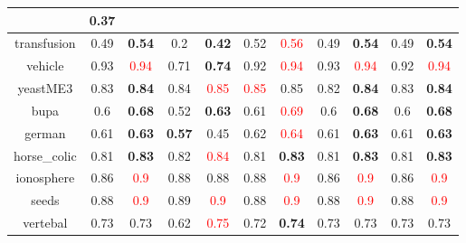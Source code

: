 \documentclass{article}%
\begin{document}
\begin{tabular}{c|cccccccccc}
{}&0.37\\%
\hline%
transfusion&0.49&\textbf{0.54}&0.2&\textbf{0.42}&0.52&\textcolor{red}{ 
0.56
}&0.49&\textbf{0.54}&0.49&\textbf{0.54}\\%
\hline%
vehicle&0.93&\textcolor{red}{ 
0.94
}&0.71&\textbf{0.74}&0.92&\textcolor{red}{ 
0.94
}&0.93&\textcolor{red}{ 
0.94
}&0.92&\textcolor{red}{ 
0.94
}\\%
\hline%
yeastME3&0.83&\textbf{0.84}&0.84&\textcolor{red}{ 
0.85
}&\textcolor{red}{ 
0.85
}&0.85&0.82&\textbf{0.84}&0.83&\textbf{0.84}\\%
\hline%
bupa&0.6&\textbf{0.68}&0.52&\textbf{0.63}&0.61&\textcolor{red}{ 
0.69
}&0.6&\textbf{0.68}&0.6&\textbf{0.68}\\%
\hline%
german&0.61&\textbf{0.63}&\textbf{0.57}&0.45&0.62&\textcolor{red}{ 
0.64
}&0.61&\textbf{0.63}&0.61&\textbf{0.63}\\%
\hline%
horse\_colic&0.81&\textbf{0.83}&0.82&\textcolor{red}{ 
0.84
}&0.81&\textbf{0.83}&0.81&\textbf{0.83}&0.81&\textbf{0.83}\\%
\hline%
ionosphere&0.86&\textcolor{red}{ 
0.9
}&0.88&0.88&0.88&\textcolor{red}{ 
0.9
}&0.86&\textcolor{red}{ 
0.9
}&0.86&\textcolor{red}{ 
0.9
}\\%
\hline%
seeds&0.88&\textcolor{red}{ 
0.9
}&0.89&\textcolor{red}{ 
0.9
}&0.88&\textcolor{red}{ 
0.9
}&0.88&\textcolor{red}{ 
0.9
}&0.88&\textcolor{red}{ 
0.9
}\\%
\hline%
vertebal&0.73&0.73&0.62&\textcolor{red}{ 
0.75
}&0.72&\textbf{0.74}&0.73&0.73&0.73&0.73\\%
\hline%
\end{tabular}

%
\end{document}
